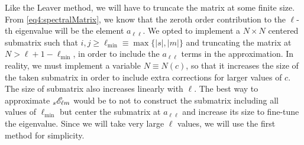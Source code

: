 Like the Leaver method, we will have to truncate the matrix at some finite size.
From \eqref{eq4:spectralMatrix}, we know that the zeroth order contribution to the $\ell$-th eigenvalue will be the element $a_{\ell\ell}$.
We opted to implement a $N\times N$ centered submatrix such that $i,j\ge\ell_\mathrm{\min}\equiv\max\{|s|,|m|\}$ and truncating the matrix at $N > \ell+1 - \ell_\mathrm{\min}$, in order to include the $a_{\ell\ell}$ terms in the approximation.
In reality, we must implement a variable $N\equiv N(c)$, so that it increases the size of the taken submatrix in order to include extra corrections for larger values of $c$. The size of submatrix also increases linearly with $\ell$.
The best way to approximate $\uu[s]{\mathscr{E}}{\ell m}$ would be to not to construct the submatrix including all values of $\ell_\mathrm{\min}$ but center the submatrix at $a_{\ell\ell}$ and increase its size to fine-tune the eigenvalue.
Since we will take very large $\ell$ values, we will use the first method for simplicity.

